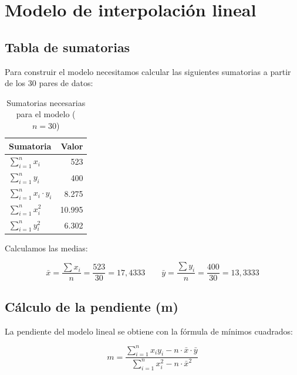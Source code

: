 \documentclass[12pt,a4paper]{article}
\begin{document}
\section{Modelo de interpolación lineal}

\subsection{Tabla de sumatorias}

Para construir el modelo necesitamos calcular las siguientes sumatorias a partir de los 30 pares de datos:

\vspace{6pt}
\begin{table}[H]
\centering
\caption{Sumatorias necesarias para el modelo ($n = 30$)}
\vspace{4pt}
\begin{tabular}{lr}
\toprule
\textbf{Sumatoria} & \textbf{Valor} \\
\midrule
$\sum_{i=1}^{n} x_i$ & 523 \\[4pt]
$\sum_{i=1}^{n} y_i$ & 400 \\[4pt]
$\sum_{i=1}^{n} x_i \cdot y_i$ & 8.275 \\[4pt]
$\sum_{i=1}^{n} x_i^2$ & 10.995 \\[4pt]
$\sum_{i=1}^{n} y_i^2$ & 6.302 \\
\bottomrule
\end{tabular}
\end{table}
\vspace{4pt}

Calculamos las medias:

\vspace{4pt}
$$\bar{x} = \frac{\sum x_i}{n} = \frac{523}{30} = 17{,}4333 \qquad \bar{y} = \frac{\sum y_i}{n} = \frac{400}{30} = 13{,}3333$$

\subsection{Cálculo de la pendiente (m)}

La pendiente del modelo lineal se obtiene con la fórmula de mínimos cuadrados:

\vspace{4pt}
$$m = \frac{\sum_{i=1}^{n} x_i y_i - n \cdot \bar{x} \cdot \bar{y}}{\sum_{i=1}^{n} x_i^2 - n \cdot \bar{x}^2}$$
\vspace{4pt}
\end{document}
